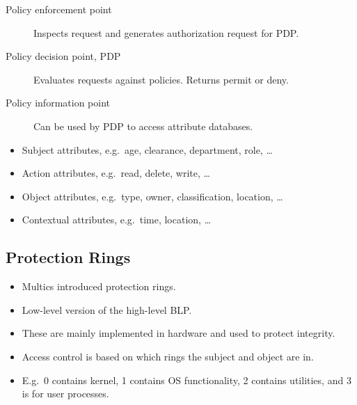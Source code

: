 \begin{frame}
  \begin{definition}
    \begin{description}
      \item[Policy enforcement point] Inspects request and generates 
        authorization request for PDP.
      \item[Policy decision point, PDP] Evaluates requests against policies.
        Returns permit or deny.
      \item[Policy information point] Can be used by PDP to access attribute 
        databases.
    \end{description}
  \end{definition}
\end{frame}

\begin{frame}
  \begin{example}[Attributes]
    \begin{itemize}
      \item Subject attributes, e.g.\ age, clearance, department, role, \dots
      \item Action attributes, e.g.\ read, delete, write, \dots
      \item Object attributes, e.g.\ type, owner, classification, location, 
        \dots
      \item Contextual attributes, e.g.\ time, location, \dots
    \end{itemize}
  \end{example}
\end{frame}

\subsection{Protection Rings}

\begin{frame}
  \begin{itemize}
    \item Multics introduced protection rings.

    \item Low-level version of the high-level BLP.

    \item These are mainly implemented in hardware and used to protect 
      integrity.

    \item Access control is based on which rings the subject and object are in.

    \item E.g.\ 0 contains kernel, 1 contains OS functionality, 2 contains 
      utilities, and 3 is for user processes.

  \end{itemize}
\end{frame}


